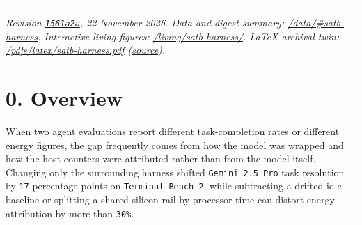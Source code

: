 \documentclass[10pt,letterpaper]{article}
\begin{document}
{
\small
\setcounter{tocdepth}{2}
\tableofcontents
}
\vspace{4pt}
\hrule
\vspace{8pt}

\emph{Revision
\href{https://github.com/openIE-dev/research-openie-web/commits/main/src/content/papers/satb-harness.md}{\texttt{1561a2a}},
22 November 2026. Data and digest summary:
\href{https://research.openie.dev/data/\#satb-harness}{/data/\#satb-harness}.
Interactive living figures:
\href{https://research.openie.dev/living/satb-harness/}{/living/satb-harness/}.
LaTeX archival twin:
\href{https://research.openie.dev/pdfs/latex/satb-harness.pdf}{/pdfs/latex/satb-harness.pdf}
(\href{https://research.openie.dev/pdfs/latex/satb-harness.tex}{source}).}

\section{0. Overview}\label{overview}

When two agent evaluations report different task-completion rates or
different energy figures, the gap frequently comes from how the model
was wrapped and how the host counters were attributed rather than from
the model itself. Changing only the surrounding harness shifted
\texttt{Gemini\ 2.\allowbreak{}5\ Pro} task resolution by \texttt{17} percentage
points on \texttt{Terminal-\allowbreak{}Bench\ 2}, while subtracting a drifted idle
baseline or splitting a shared silicon rail by processor time can
distort energy attribution by more than \texttt{30\%}.
\end{document}
